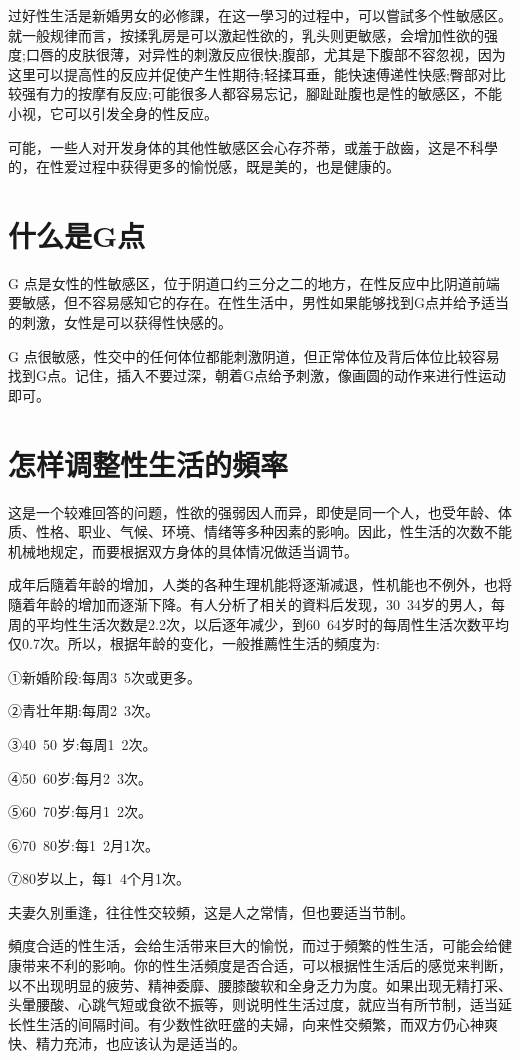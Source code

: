\documentclass[12pt,UTF8]{ctexbook}
\begin{document}
过好性生活是新婚男女的必修課，在这一學习的过程中，可以嘗試多个性敏感区。就一般规律而言，按揉乳房是可以激起性欲的，乳头则更敏感，会增加性欲的强度;口唇的皮肤很薄，对异性的刺激反应很快;腹部，尤其是下腹部不容忽视，因为这里可以提高性的反应并促使产生性期待;轻揉耳垂，能快速傅递性快感;臀部对比较强有力的按摩有反应;可能很多人都容易忘记，腳趾趾腹也是性的敏感区，不能小视，它可以引发全身的性反应。

可能，一些人对开发身体的其他性敏感区会心存芥蒂，或羞于啟齒，这是不科學的，在性爱过程中获得更多的愉悦感，既是美的，也是健康的。

\section{什么是G点}

G 点是女性的性敏感区，位于阴道口约三分之二的地方，在性反应中比阴道前端要敏感，但不容易感知它的存在。在性生活中，男性如果能够找到G点并给予适当的刺激，女性是可以获得性快感的。

G 点很敏感，性交中的任何体位都能刺激阴道，但正常体位及背后体位比较容易找到G点。记住，插入不要过深，朝着G点给予刺激，像画圆的动作来进行性运动即可。

\section{怎样调整性生活的頻率}

这是一个较难回答的问题，性欲的强弱因人而异，即使是同一个人，也受年龄、体质、性格、职业、气候、环境、情绪等多种因素的影响。因此，性生活的次数不能机械地规定，而要根据双方身体的具体情况做适当调节。

成年后隨着年龄的增加，人类的各种生理机能将逐渐减退，性机能也不例外，也将隨着年龄的增加而逐渐下降。有人分析了相关的資料后发现，30~34岁的男人，每周的平均性生活次数是2.2次，以后逐年减少，到60~64岁时的每周性生活次数平均仅0.7次。所以，根据年龄的变化，一般推薦性生活的頻度为:

①新婚阶段:每周3~5次或更多。

②青壮年期:每周2~3次。

③40~50 岁:每周1~2次。

④50~60岁:每月2~3次。

⑤60~70岁:每月1~2次。

⑥70~80岁:每1~2月1次。

⑦80岁以上，每1~4个月1次。

夫妻久別重逢，往往性交较頻，这是人之常情，但也要适当节制。

頻度合适的性生活，会给生活带来巨大的愉悦，而过于頻繁的性生活，可能会给健康带来不利的影响。你的性生活頻度是否合适，可以根据性生活后的感觉来判断，以不出现明显的疲劳、精神委靡、腰膝酸软和全身乏力为度。如果出现无精打采、头暈腰酸、心跳气短或食欲不振等，则说明性生活过度，就应当有所节制，适当延长性生活的间隔时间。有少数性欲旺盛的夫婦，向来性交頻繁，而双方仍心神爽快、精力充沛，也应该认为是适当的。
\end{document}
